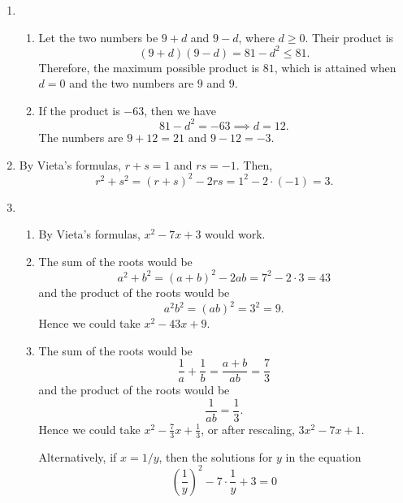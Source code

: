 \begin{enumerate}
\begin{enumerate}
\end{enumerate}
\item \begin{enumerate}
\item Let the two numbers be $9 + d$ and $9 - d$, where $d\geq 0$. Their product is
\begin{equation*}
(9 + d)(9 - d) = 81 - d^2\leq 81.
\end{equation*}
Therefore, the maximum possible product is $\boxed{81}$, which is attained when $d = 0$ and the two numbers are $9$ and $9$.
\item If the product is $-63$, then we have
\begin{equation*}
81 - d^2 = -63\implies d = 12.
\end{equation*}
The numbers are $9 + 12 = \boxed{21}$ and $9 - 12 = \boxed{-3}$.
\end{enumerate}
\item By Vieta's formulas, $r + s = 1$ and $rs = -1$. Then,
\begin{equation*}
r^2 + s^2 = (r + s)^2 - 2rs = 1^2 - 2\cdot (-1) = \boxed{3}.
\end{equation*}
\item \begin{enumerate}
\item By Vieta's formulas, $\boxed{x^2 - 7x + 3}$ would work.
\item The sum of the roots would be
\begin{equation*}
a^2 + b^2 = (a + b)^2 - 2ab = 7^2 - 2\cdot 3 = 43
\end{equation*}
and the product of the roots would be
\begin{equation*}
a^2b^2 = (ab)^2 = 3^2 = 9.
\end{equation*}
Hence we could take $\boxed{x^2 - 43x + 9}$.
\item The sum of the roots would be 
\begin{equation*}
\frac{1}{a} + \frac{1}{b} = \frac{a + b}{ab} = \frac{7}{3}
\end{equation*}
and the product of the roots would be 
\begin{equation*}
\frac{1}{ab} = \frac{1}{3}.
\end{equation*}
Hence we could take $x^2 - \frac{7}{3}x + \frac{1}{3}$, or after rescaling, $\boxed{3x^2 - 7x + 1}$.\par 
Alternatively, if $x = 1/y$, then the solutions for $y$ in the equation
\begin{equation*}
\left(\frac{1}{y}\right)^2 - 7\cdot\frac{1}{y} + 3 = 0

\end{equation*}
\end{enumerate}
\end{enumerate}
